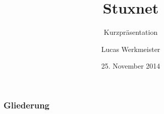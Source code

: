 \documentclass{beamer}
\title{Stuxnet}
\subtitle{Kurzpräsentation}
\author{Lucas Werkmeister}
\date{25. November 2014}
\begin{document}
\begin{frame}
  \titlepage
\end{frame}

\begin{frame}
  \frametitle{Gliederung}
  \tableofcontents
\end{frame}
\end{document}

